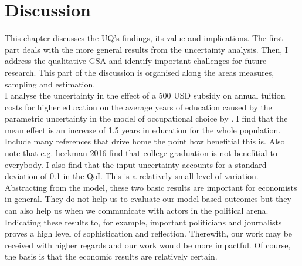 \section{Discussion}
\thispagestyle{plain}  %

This chapter discusses the UQ's findings, its value and implications. The first part deals with the more general results from the uncertainty analysis. Then, I address the qualitative GSA and identify important challenges for future research. This part of the discussion is organised along the areas measures, sampling and estimation.\\

\noindent
I analyse the uncertainty in  the effect of a 500 USD subsidy on annual tuition costs for higher education on the average years of education caused by the parametric uncertainty in the model of occupational choice by \cite{Keane.1994}. I find that the mean effect is an increase of 1.5 years in education for the whole population. {\color{red}Include many references that drive home the point how benefitial this is. Also note that e.g. heckman 2016 find that college graduation is not benefitial to everybody.}
I also find that the input uncertainty accounts for a standard deviation of 0.1 in the QoI. This is a relatively small level of variation. Abstracting from the model, these two basic results are important for economists in general. They do not help us to evaluate our model-based outcomes but they can also help us when we communicate with actors in the political arena. Indicating these results to, for example, important politicians and journalists proves a high level of sophistication and reflection. Therewith, our work may be received with higher regards and our work would be more impactful. Of course, the basis is that the economic results are relatively certain.\\


